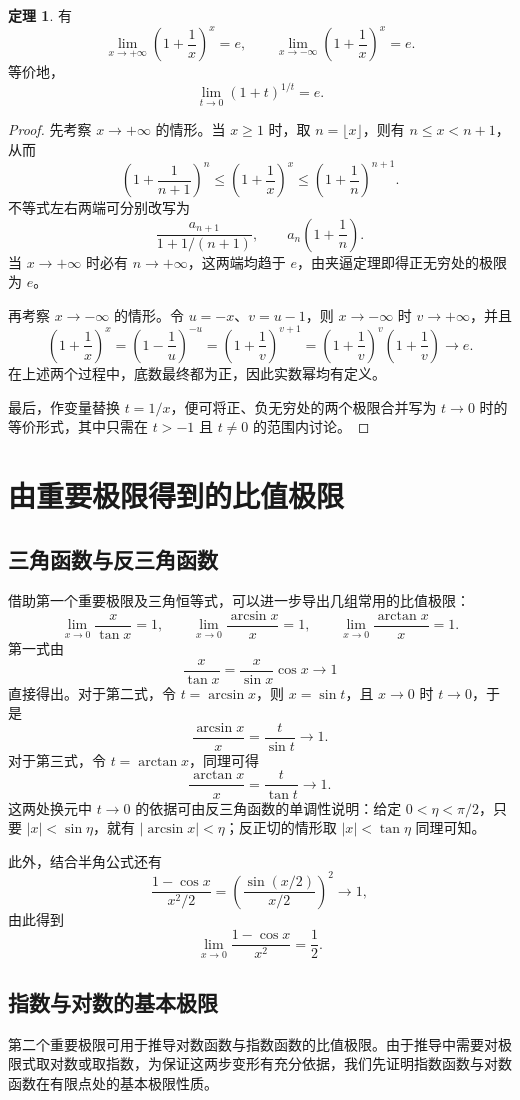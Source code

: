 \documentclass[UTF8,fontset=fandol,a4paper,12pt]{ctexart}
\theoremstyle{definition}
\newtheorem*{theorem}{定理}
\begin{document}
\begin{theorem}
有
\[
 \lim_{x\to+\infty}\left(1+\frac1x\right)^x=e,
 \qquad
 \lim_{x\to-\infty}\left(1+\frac1x\right)^x=e.
\]
等价地，
\[
 \boxed{\lim_{t\to0}(1+t)^{1/t}=e.}
\]
\end{theorem}
\begin{proof}
先考察 $x\to+\infty$ 的情形。当 $x\ge1$ 时，取 $n=\lfloor x\rfloor$，则有 $n\le x<n+1$，从而
\[
 \left(1+\frac1{n+1}\right)^n
 \le\left(1+\frac1x\right)^x
 \le\left(1+\frac1n\right)^{n+1}.
\]
不等式左右两端可分别改写为
\[
 \frac{a_{n+1}}{1+1/(n+1)},\qquad a_n\left(1+\frac1n\right).
\]
当 $x\to+\infty$ 时必有 $n\to+\infty$，这两端均趋于 $e$，由夹逼定理即得正无穷处的极限为 $e$。

再考察 $x\to-\infty$ 的情形。令 $u=-x$、$v=u-1$，则 $x\to-\infty$ 时 $v\to+\infty$，并且
\[
 \left(1+\frac1x\right)^x
 =\left(1-\frac1u\right)^{-u}
 =\left(1+\frac1v\right)^{v+1}
 =\left(1+\frac1v\right)^v\left(1+\frac1v\right)\to e.
\]
在上述两个过程中，底数最终都为正，因此实数幂均有定义。

最后，作变量替换 $t=1/x$，便可将正、负无穷处的两个极限合并写为 $t\to0$ 时的等价形式，其中只需在 $t>-1$ 且 $t\ne0$ 的范围内讨论。
\end{proof}

\section{由重要极限得到的比值极限}
\subsection*{三角函数与反三角函数}
借助第一个重要极限及三角恒等式，可以进一步导出几组常用的比值极限：
\[
 \lim_{x\to0}\frac{x}{\tan x}=1,\qquad
 \lim_{x\to0}\frac{\arcsin x}{x}=1,\qquad
 \lim_{x\to0}\frac{\arctan x}{x}=1.
\]
第一式由
\[
 \frac{x}{\tan x}=\frac{x}{\sin x}\cos x\to1
\]
直接得出。对于第二式，令 $t=\arcsin x$，则 $x=\sin t$，且 $x\to0$ 时 $t\to0$，于是
\[
 \frac{\arcsin x}{x}=\frac{t}{\sin t}\to1.
\]
对于第三式，令 $t=\arctan x$，同理可得
\[
 \frac{\arctan x}{x}=\frac{t}{\tan t}\to1.
\]
这两处换元中 $t\to0$ 的依据可由反三角函数的单调性说明：给定 $0<\eta<\pi/2$，只要 $|x|<\sin\eta$，就有 $|\arcsin x|<\eta$；反正切的情形取 $|x|<\tan\eta$ 同理可知。

此外，结合半角公式还有
\[
 \frac{1-\cos x}{x^2/2}
 =\left(\frac{\sin(x/2)}{x/2}\right)^2\to1,
\]
由此得到
\[
 \lim_{x\to0}\frac{1-\cos x}{x^2}=\frac12.
\]

\subsection*{指数与对数的基本极限}
第二个重要极限可用于推导对数函数与指数函数的比值极限。由于推导中需要对极限式取对数或取指数，为保证这两步变形有充分依据，我们先证明指数函数与对数函数在有限点处的基本极限性质。
\end{document}
